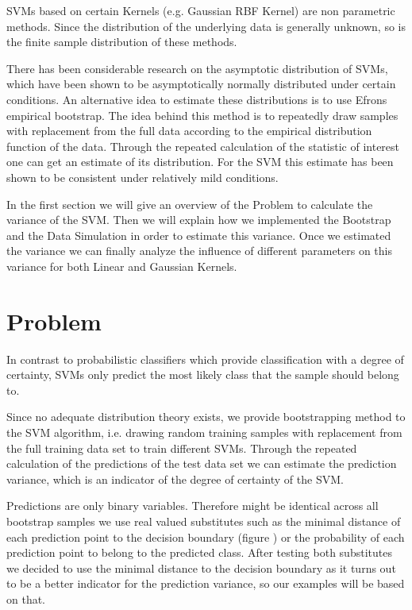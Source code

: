 \documentclass[a4paper]{article}
\begin{document}
SVMs based on certain Kernels (e.g. Gaussian RBF Kernel) are non parametric methods. Since the distribution of the underlying data is generally unknown, so is the finite sample distribution of these methods.\cite{hastie_elements_2005}

There has been considerable research on the asymptotic distribution of SVMs, which have been shown to be asymptotically normally distributed under certain conditions. An alternative idea to estimate these distributions is to use Efrons empirical bootstrap\cite{efron_introduction_1994}. The idea behind this method is to repeatedly draw samples with replacement from the full data according to the empirical distribution function of the data. Through the repeated calculation of the statistic of interest one can get an estimate of its distribution. For the SVM this estimate has been shown to be consistent under relatively mild conditions.
    
In the first section we will give an overview of the Problem to calculate the variance of the SVM. Then we will explain how we implemented the Bootstrap and the Data Simulation in order to estimate this variance. Once we estimated the variance we can finally analyze the influence of different parameters on this variance for both Linear and Gaussian Kernels.

\section{Problem}
In contrast to probabilistic classifiers which provide classification with a degree of certainty, SVMs only predict the most likely class that the sample should belong to.  

Since no adequate distribution theory exists, we provide bootstrapping method to the SVM algorithm, i.e. drawing random training samples with replacement from the full training data set to train different SVMs. Through the repeated calculation of the predictions of the test data set we can estimate the prediction variance, which is an indicator of the degree of certainty of the SVM. 

Predictions are only binary variables. Therefore might be identical across all bootstrap samples we use real valued substitutes such as the minimal distance of each prediction point to the decision boundary (figure \label{fig1}) or the probability of each prediction point to belong to the predicted class. After testing both substitutes we decided to use the minimal distance to the decision boundary as it turns out to be a better indicator for the prediction variance, so our examples will be based on that. 
\end{document}
